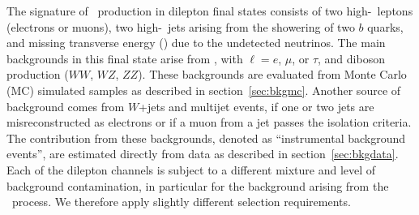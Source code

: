 \documentclass[aps,prd,twocolumn,showpacs,superscriptaddress,groupedaddress,floatfix]{revtex4}
\begin{document}
The signature of \ttbar\ production in dilepton final states
consists of two high-\pt\ leptons  (electrons or muons), two high-\pt\ jets arising from the showering of two  $b$ quarks,
and  missing transverse energy (\met) due to the undetected neutrinos.
The main backgrounds in this final state arise from 
\zl, with $\ell=e$, $\mu$, or $\tau$,  and diboson production ($WW$, $WZ$, $ZZ$).
These backgrounds are evaluated from Monte Carlo (MC) simulated samples as described in section~\ref{sec:bkgmc}.
Another source of background comes from  $W$+jets and multijet events,
if one or two jets 
are misreconstructed as  electrons or if a muon
from a jet passes the isolation criteria.
The contribution from these backgrounds, denoted as ``instrumental background events'', are estimated directly from data as described in section~\ref{sec:bkgdata}.
Each of the dilepton channels is subject to a different mixture and level of background contamination,
in particular for the background arising from the \zl\ process. 
We therefore apply  slightly different selection requirements.
\end{document}
